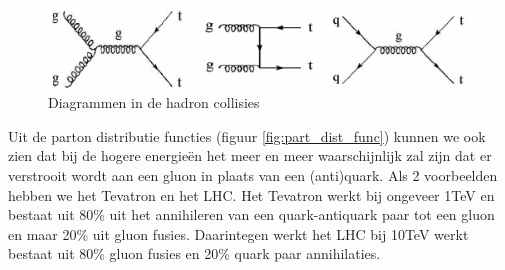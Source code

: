 \documentclass[../main.tex]{subfiles}
\begin{document}
\begin{figure}[h]
    \centering
    \includegraphics[width=0.8\linewidth]{QCD/hadr_coll_diagr.png}
    \caption{Diagrammen in de hadron collisies}%
    \label{fig:QCD/hadr_coll_diagr}
\end{figure}

Uit de parton distributie functies (figuur \ref{fig:part_dist_func}) kunnen we ook zien dat bij de hogere energieën het meer en meer waarschijnlijk zal zijn dat er verstrooit wordt aan een gluon in plaats van een (anti)quark. Als 2 voorbeelden hebben we het Tevatron en het LHC. Het Tevatron werkt bij ongeveer 1TeV en bestaat uit 80\% uit het annihileren van een quark-antiquark paar tot een gluon en maar 20\% uit gluon fusies. Daarintegen werkt het LHC bij 10TeV werkt bestaat uit 80\% gluon fusies en 20\% quark paar annihilaties.
\end{document}
